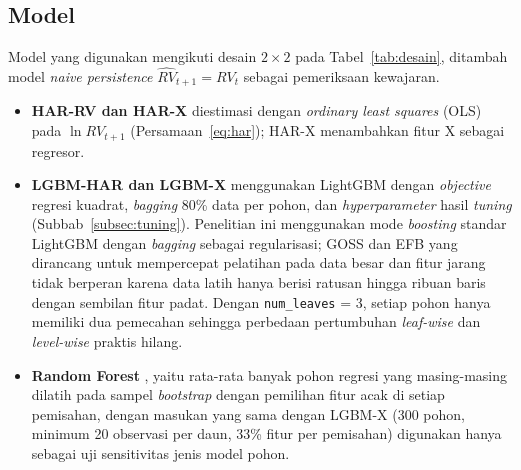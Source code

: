\subsection{Model}
Model yang digunakan mengikuti desain $2 \times 2$ pada
Tabel~\ref{tab:desain}, ditambah model \textit{naive persistence}
$\widehat{RV}_{t+1} = RV_t$ sebagai pemeriksaan kewajaran.
\begin{itemize}
  \item \textbf{HAR-RV dan HAR-X} diestimasi dengan \textit{ordinary least
        squares} (OLS) pada $\ln RV_{t+1}$ (Persamaan~\eqref{eq:har}); HAR-X
        menambahkan fitur X sebagai regresor.
  \item \textbf{LGBM-HAR dan LGBM-X} menggunakan LightGBM \cite{ke2017} dengan
        \textit{objective} regresi kuadrat, \textit{bagging} 80\% data per
        pohon, dan \textit{hyperparameter} hasil \textit{tuning}
        (Subbab~\ref{subsec:tuning}). Penelitian ini menggunakan mode
        \textit{boosting} standar LightGBM dengan \textit{bagging} sebagai
        regularisasi; GOSS dan EFB yang dirancang untuk mempercepat pelatihan
        pada data besar dan fitur jarang tidak berperan karena data latih
        hanya berisi ratusan hingga ribuan baris dengan sembilan fitur padat.
        Dengan \texttt{num\_leaves} = 3, setiap pohon hanya memiliki dua
        pemecahan sehingga perbedaan pertumbuhan \textit{leaf-wise} dan
        \textit{level-wise} praktis hilang.
  \item \textbf{Random Forest} \cite{breiman2001}, yaitu rata-rata banyak
        pohon regresi yang masing-masing dilatih pada sampel
        \textit{bootstrap} dengan pemilihan fitur acak di setiap pemisahan,
        dengan masukan yang sama dengan LGBM-X (300 pohon, minimum
        20 observasi per daun, 33\% fitur per pemisahan) digunakan hanya
        sebagai uji sensitivitas jenis model pohon.
\end{itemize}

